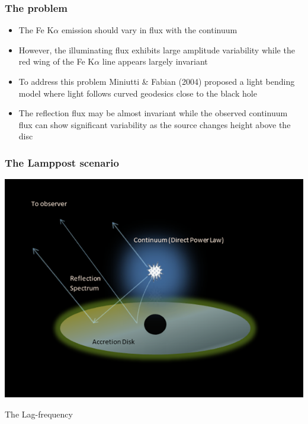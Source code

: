 \documentclass[]{beamer}
\begin{document}
\begin{frame}
\frametitle{The problem}

\begin{itemize}
\item The Fe K$\alpha$ emission should vary in flux with the continuum \pause

\item However, the illuminating flux exhibits large amplitude variability while the red wing of the Fe K$\alpha$ line appears largely invariant \pause 

\item To address this problem Miniutti \& Fabian (2004) proposed a light bending model where light follows curved geodesics close to the black hole \pause

\item The reflection flux may be almost invariant while the observed continuum flux can show significant variability as the source changes height above the disc
\end{itemize}
\end{frame}

\begin{frame}
\frametitle{The Lamppost scenario} \centering 
{
\includegraphics[scale=0.6]{lampost1.png}\\
}
\end{frame}

\begin{frame}
\centering
\large{The Lag-frequency}
\end{frame}
\end{document}

